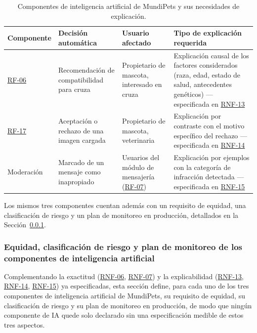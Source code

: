 \documentclass[journal,onecolumn]{IEEEtran}
\begin{document}
	\begin{table}[H]
		\centering
		\caption{Componentes de inteligencia artificial de MundiPets y sus necesidades de explicación.}
		\label{tab:componentes-ia}
		\small
		\begin{tabularx}{\textwidth}{@{}p{2.0cm} p{3.0cm} p{2.6cm} X@{}}
			\toprule
			\textbf{Componente} & \textbf{Decisión automática} & \textbf{Usuario afectado} & \textbf{Tipo de explicación requerida} \\
			\midrule
			\hyperref[tab:RF-06]{RF-06} & Recomendación de compatibilidad para cruza & Propietario de mascota, interesado en cruza & Explicación causal de los factores considerados (raza, edad, estado de salud, antecedentes genéticos) --- especificada en \hyperref[tab:RNF-13]{RNF-13} \\
			\addlinespace
			\hyperref[tab:RF-17]{RF-17} & Aceptación o rechazo de una imagen cargada & Propietario de mascota, veterinaria & Explicación por contraste con el motivo específico del rechazo --- especificada en \hyperref[tab:RNF-14]{RNF-14} \\
			\addlinespace
			Moderación & Marcado de un mensaje como inapropiado & Usuarios del módulo de mensajería (\hyperref[tab:RF-07]{RF-07}) & Explicación por ejemplos con la categoría de infracción detectada --- especificada en \hyperref[tab:RNF-15]{RNF-15} \\
			\bottomrule
		\end{tabularx}
	\end{table}
	Los mismos tres componentes cuentan además con un requisito de equidad,
	una clasificación de riesgo y un plan de monitoreo en producción,
	detallados en la Sección~\ref{sec:equidad-riesgo-ia}.
	
\subsubsection{Equidad, clasificación de riesgo y plan de monitoreo de los componentes de inteligencia artificial}
\label{sec:equidad-riesgo-ia}

Complementando la exactitud (\hyperref[tab:RNF-06]{RNF-06}, \hyperref[tab:RNF-07]{RNF-07}) y la explicabilidad (\hyperref[tab:RNF-13]{RNF-13},
\hyperref[tab:RNF-14]{RNF-14}, \hyperref[tab:RNF-15]{RNF-15}) ya especificadas, esta sección define, para cada uno de los
tres componentes de inteligencia artificial de MundiPets, su requisito de
equidad, su clasificación de riesgo y su plan de monitoreo en producción,
de modo que ningún componente de IA quede solo declarado sin una
especificación medible de estos tres aspectos.
\end{document}
